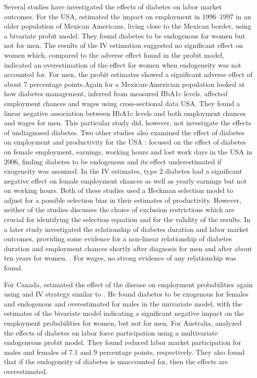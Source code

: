 \documentclass[12pt,english,british]{article}
\begin{document}
Several studies have investigated the effects of diabetes on labor market outcomes. For the USA, \citet{Brown2005} estimated the impact on employment in 1996--1997 in an older population of Mexican Americans, living  close to the Mexican border, using a bivariate probit model. They found diabetes to be endogenous for women but not for men. The results of the \ac{IV} estimation suggested no significant effect on women which, compared to the adverse effect found in the probit model, indicated an overestimation of the effect for women when endogeneity was not accounted for. For men, the probit estimates showed a significant adverse effect of about 7 percentage points.Again for a Mexican-Americian population \citet{BrownIII2011 } looked at how diabetes management, inferred from measured \ac{HbA1c} levels,
affected employment chances and wages using cross-sectional data
USA. They found a linear negative association between \ac{HbA1c} levels and both 
employment chances and wages for men. This particular study did, however, not investigate the effects of undiagnosed diabetes. Two other studies also examined the effect of diabetes on employment and productivity for the USA : \citet{Minor2010} focused on the effect of diabetes on female employment, earnings, working hours and lost work days in the \ac{USA} in 2006, finding diabetes to be endogenous and its effect underestimated   if exogeneity was assumed. In the \ac{IV} estimates, type 2 diabetes had a significant negative effect on female employment chances as well as yearly earnings but not on working hours. Both of these studies used a Heckman selection model to adjust for a possible selection bias in their estimates of productivity. However, neither of the studies discusses the choice of exclusion restrictions which are crucial for identifying the selection equation and for the validity of the results. In a later study \citet{Minor2013} investigated the relationship of diabetes duration and labor market outcomes, providing some evidence for a non-linear relationship of diabetes duration and employment chances shortly after diagnosis for men and after about ten years for women. .  For wages, no strong evidence of  any relationship was found.

For Canada, \citet{Latif2009} estimated the effect of the disease on employment probabilities again using and \ac{IV} strategy similar to \citet{Brown2005}. He found diabetes to be exogenous for females and endogenous and overestimated for males in the univariate model, with the estimates of the bivariate model indicating a significant negative impact on the employment probabilities for women, but not for men. 
For Australia, \cite{Zhang2009} analyzed the effects of diabetes on labor force participation using a multivariate endogeneous probit model. They found reduced labor market participation for males and females of 7.1 and 9 percentage points, respectively. They also found that if the endogeneity of diabetes is unaccounted for, then the effects are overestimated. 
\end{document}
